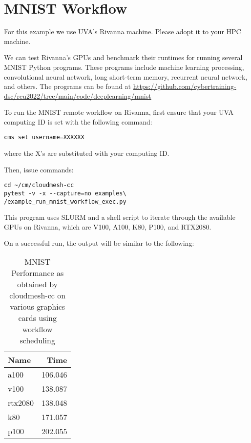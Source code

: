 
\section{MNIST Workflow}\label{mnist-workflow}

For this example we use UVA's Rivanna machine. Please adopt it to your
HPC machine.

We can test Rivanna's GPUs and benchmark their runtimes for running
several MNIST Python programs. These programs include machine learning
processing, convolutional neural network, long short-term memory,
recurrent neural network, and others. The programs can be found at
\url{https://github.com/cybertraining-dsc/reu2022/tree/main/code/deeplearning/mnist}

To run the MNIST remote workflow on Rivanna, first ensure that your UVA
computing ID is set with the following command:

\begin{verbatim}
cms set username=XXXXXX
\end{verbatim}

where the X's are substituted with your computing ID.

Then, issue commands:

\begin{verbatim}
cd ~/cm/cloudmesh-cc
pytest -v -x --capture=no examples\
/example_run_mnist_workflow_exec.py
\end{verbatim}

This program uses SLURM and a shell script to iterate through the
available GPUs on Rivanna, which are V100, A100, K80, P100, and RTX2080.

On a successful run, the output will be similar to the following:

\begin{table}[!ht]
\caption{MNIST Performance as obtained by cloudmesh-cc on various graphics cards using workflow scheduling}
    \centering
    \begin{tabular}{lr}
    \hline
        Name & Time \\ \hline
        a100 & 106.046 \\ 
        v100 & 138.087 \\ 
        rtx2080 & 138.048 \\
        k80 & 171.057 \\ 
        p100 & 202.055 \\
    \end{tabular}
  \end{table}
  
